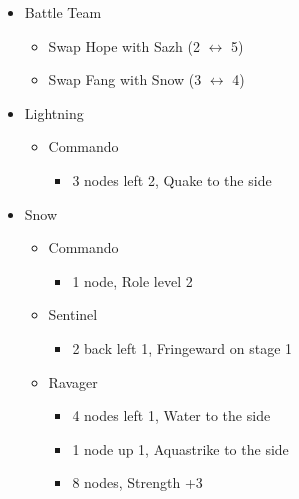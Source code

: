 \begin{menu}
\begin{itemize}
    \paradigm
    \begin{itemize}
        \item Battle Team
        \begin{itemize}
            \item Swap Hope with Sazh (2 $\leftrightarrow$ 5)
            \item Swap Fang with Snow (3 $\leftrightarrow$ 4)
        \end{itemize}
{\paradigmline[1]{\textit{\com}}{\textit{\syn}}{\textit{(\com)}}}%
{\paradigmline{(\rav)}{\rav}{\rav}}%
{\paradigmline{(\com)}{\syn}{\sen}}%
{\paradigmline{[\rav]}{(\rav)}{(\rav)}}%
{\paradigmline{\com}{[\com]}{\com}}%
{\paradigmline{\com}{[\com]}{\com}}
    \end{itemize}
    \crystarium
    \begin{itemize}
        \item Lightning
        \begin{itemize}
            \item Commando
            \begin{itemize}
                \item 3 nodes left 2, Quake to the side
            \end{itemize}
        \end{itemize}
        \item Snow
        \begin{itemize}
            \item Commando
            \begin{itemize}
                \item 1 node, Role level 2
            \end{itemize}
            \item Sentinel
            \begin{itemize}
                \item 2 back left 1, Fringeward on stage 1
            \end{itemize}
            \item Ravager
            \begin{itemize}
                \item 4 nodes left 1, Water to the side
                \item 1 node up 1, Aquastrike to the side
                \item 8 nodes, Strength +3

\end{itemize}
\end{itemize}
\end{itemize}
\end{itemize}
\end{menu}
